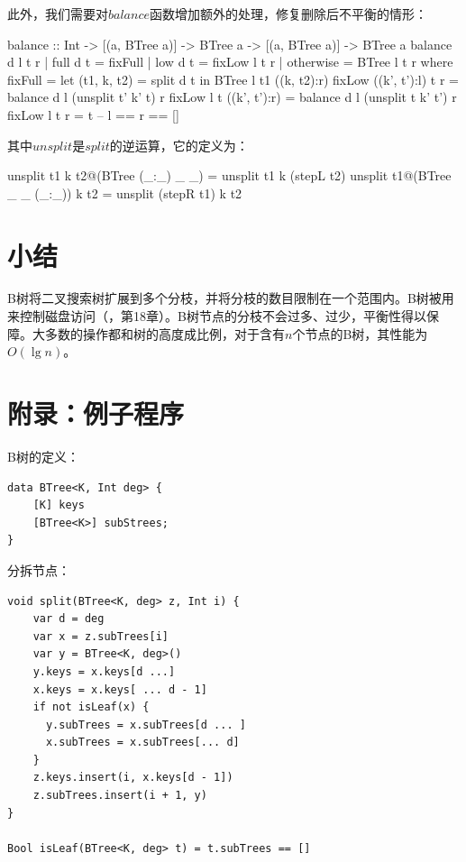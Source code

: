\documentclass[b5paper]{ctexart}
\begin{document}
\begin{Answer}[ref = {ex:btree-del}]
{此外，我们需要对$balance$函数增加额外的处理，修复删除后不平衡的情形：
\begin{Haskell}
balance :: Int -> [(a, BTree a)] -> BTree a -> [(a, BTree a)] -> BTree a
balance d l t r | full d t = fixFull
                | low  d t = fixLow l t r
                | otherwise = BTree l t r
  where
    fixFull = let (t1, k, t2) = split d t in BTree l t1 ((k, t2):r)
    fixLow ((k', t'):l) t r = balance d l (unsplit t' k' t) r
    fixLow l t ((k', t'):r) = balance d l (unsplit t k' t') r
    fixLow l t r = t        -- l == r == []
\end{Haskell}

其中$unsplit$是$split$的逆运算，它的定义为：
\begin{Haskell}
unsplit t1 k t2@(BTree (_:_) _ _) = unsplit t1 k (stepL t2)
unsplit t1@(BTree _ _ (_:_)) k t2 = unsplit (stepR t1) k t2
\end{Haskell}
}
\end{Answer}

\section{小结}

B树将二叉搜索树扩展到多个分枝，并将分枝的数目限制在一个范围内。B树被用来控制磁盘访问（\cite{CLRS}，第18章）。B树节点的分枝不会过多、过少，平衡性得以保障。大多数的操作都和树的高度成比例，对于含有$n$个节点的B树，其性能为$O(\lg n)$。

\section{附录：例子程序}

B树的定义：

\begin{lstlisting}[language = Bourbaki]
data BTree<K, Int deg> {
    [K] keys
    [BTree<K>] subStrees;
}
\end{lstlisting}

分拆节点：

\begin{lstlisting}[language = Bourbaki]
void split(BTree<K, deg> z, Int i) {
    var d = deg
    var x = z.subTrees[i]
    var y = BTree<K, deg>()
    y.keys = x.keys[d ...]
    x.keys = x.keys[ ... d - 1]
    if not isLeaf(x) {
      y.subTrees = x.subTrees[d ... ]
      x.subTrees = x.subTrees[... d]
    }
    z.keys.insert(i, x.keys[d - 1])
    z.subTrees.insert(i + 1, y)
}

Bool isLeaf(BTree<K, deg> t) = t.subTrees == []
\end{lstlisting}
\end{document}
